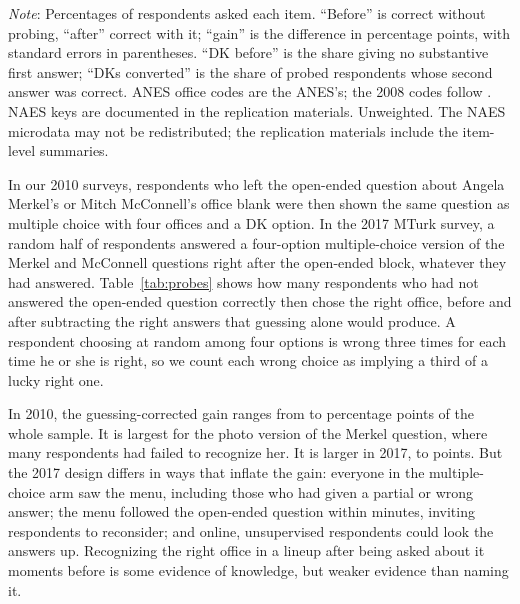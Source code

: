 \documentclass[11pt]{article}
\begin{document}
\begin{table}[htbp]
\centering\TableStyle
\caption{Repeating the question after a don't-know: ANES and NAES, 2000--2008.}
\label{tab:public}
\begin{minipage}{0.95\linewidth}\footnotesize
\emph{Note}: Percentages of respondents asked each item. ``Before'' is correct without probing, ``after'' correct with it; ``gain'' is the difference in percentage points, with standard errors in parentheses. ``DK before'' is the share giving no substantive first answer; ``DKs converted'' is the share of probed respondents whose second answer was correct. ANES office codes are the ANES's; the 2008 codes follow \citet{krosnick2008}. NAES keys are documented in the replication materials. Unweighted. The NAES microdata may not be redistributed; the replication materials include the item-level summaries.
\end{minipage}
\end{table}

In our 2010 surveys, respondents who left the open-ended question about Angela Merkel's or Mitch McConnell's office blank were then shown the same question as multiple choice with four offices and a DK option. In the 2017 MTurk survey, a random half of respondents answered a four-option multiple-choice version of the Merkel and McConnell questions right after the open-ended block, whatever they had answered. Table~\ref{tab:probes} shows how many respondents who had not answered the open-ended question correctly then chose the right office, before and after subtracting the right answers that guessing alone would produce. A respondent choosing at random among four options is wrong three times for each time he or she is right, so we count each wrong choice as implying a third of a lucky right one.

In 2010, the guessing-corrected gain ranges from \probeGainMin{} to \probeGainMax{} percentage points of the whole sample. It is largest for the photo version of the Merkel question, where many respondents had failed to recognize her. It is larger in 2017, \probeMturkMin{} to \probeMturkMax{} points. But the 2017 design differs in ways that inflate the gain: everyone in the multiple-choice arm saw the menu, including those who had given a partial or wrong answer; the menu followed the open-ended question within minutes, inviting respondents to reconsider; and online, unsupervised respondents could look the answers up. Recognizing the right office in a lineup after being asked about it moments before is some evidence of knowledge, but weaker evidence than naming it.
\end{document}
